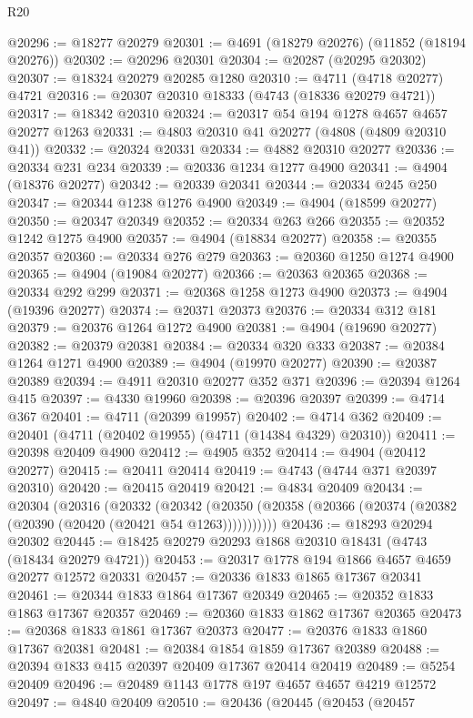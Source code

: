 \begin{lexlean}{R20}
\begin{coremodule}
@20296 := @18277 @20279
@20301 := @4691 (@18279 @20276) (@11852 (@18194 @20276))
@20302 := @20296 @20301
@20304 := @20287 (@20295 @20302)
@20307 := @18324 @20279 @20285 @1280
@20310 := @4711 (@4718 @20277) @4721
@20316 := @20307 @20310 @18333 (@4743 (@18336 @20279 @4721))
@20317 := @18342 @20310
@20324 := @20317 @54 @194 @1278 @4657 @4657 @20277 @1263
@20331 := @4803 @20310 @41 @20277 (@4808 (@4809 @20310 @41))
@20332 := @20324 @20331
@20334 := @4882 @20310 @20277
@20336 := @20334 @231 @234
@20339 := @20336 @1234 @1277 @4900
@20341 := @4904 (@18376 @20277)
@20342 := @20339 @20341
@20344 := @20334 @245 @250
@20347 := @20344 @1238 @1276 @4900
@20349 := @4904 (@18599 @20277)
@20350 := @20347 @20349
@20352 := @20334 @263 @266
@20355 := @20352 @1242 @1275 @4900
@20357 := @4904 (@18834 @20277)
@20358 := @20355 @20357
@20360 := @20334 @276 @279
@20363 := @20360 @1250 @1274 @4900
@20365 := @4904 (@19084 @20277)
@20366 := @20363 @20365
@20368 := @20334 @292 @299
@20371 := @20368 @1258 @1273 @4900
@20373 := @4904 (@19396 @20277)
@20374 := @20371 @20373
@20376 := @20334 @312 @181
@20379 := @20376 @1264 @1272 @4900
@20381 := @4904 (@19690 @20277)
@20382 := @20379 @20381
@20384 := @20334 @320 @333
@20387 := @20384 @1264 @1271 @4900
@20389 := @4904 (@19970 @20277)
@20390 := @20387 @20389
@20394 := @4911 @20310 @20277 @352 @371
@20396 := @20394 @1264 @415
@20397 := @4330 @19960
@20398 := @20396 @20397
@20399 := @4714 @367
@20401 := @4711 (@20399 @19957)
@20402 := @4714 @362
@20409 := @20401 (@4711 (@20402 @19955) (@4711 (@14384 @4329) @20310))
@20411 := @20398 @20409 @4900
@20412 := @4905 @352
@20414 := @4904 (@20412 @20277)
@20415 := @20411 @20414
@20419 := @4743 (@4744 @371 @20397 @20310)
@20420 := @20415 @20419
@20421 := @4834 @20409
@20434 := @20304
    (@20316
      (@20332
        (@20342 (@20350 (@20358 (@20366 (@20374 (@20382 (@20390 (@20420 (@20421 @54 @1263)))))))))))
@20436 := @18293 @20294 @20302
@20445 := @18425 @20279 @20293 @1868 @20310 @18431 (@4743 (@18434 @20279 @4721))
@20453 := @20317 @1778 @194 @1866 @4657 @4659 @20277 @12572 @20331
@20457 := @20336 @1833 @1865 @17367 @20341
@20461 := @20344 @1833 @1864 @17367 @20349
@20465 := @20352 @1833 @1863 @17367 @20357
@20469 := @20360 @1833 @1862 @17367 @20365
@20473 := @20368 @1833 @1861 @17367 @20373
@20477 := @20376 @1833 @1860 @17367 @20381
@20481 := @20384 @1854 @1859 @17367 @20389
@20488 := @20394 @1833 @415 @20397 @20409 @17367 @20414 @20419
@20489 := @5254 @20409
@20496 := @20489 @1143 @1778 @197 @4657 @4657 @4219 @12572
@20497 := @4840 @20409
@20510 := @20436
    (@20445
      (@20453
        (@20457

\end{coremodule}
\end{lexlean}
